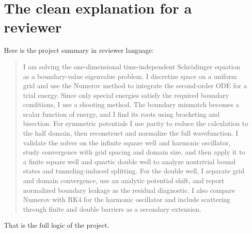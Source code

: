 \documentclass[11pt]{article}
\begin{document}
    \section{The clean explanation for a reviewer}

    Here is the project summary in reviewer language:

    \begin{quote}
    I am solving the one-dimensional time-independent Schr\"odinger equation as a boundary-value eigenvalue problem. I discretize space on a uniform grid and use the Numerov method to integrate the second-order ODE for a trial energy. Since only special energies satisfy the required boundary conditions, I use a shooting method. The boundary mismatch becomes a scalar function of energy, and I find its roots using bracketing and bisection. For symmetric potentials I use parity to reduce the calculation to the half domain, then reconstruct and normalize the full wavefunction. I validate the solver on the infinite square well and harmonic oscillator, study convergence with grid spacing and domain size, and then apply it to a finite square well and quartic double well to analyze nontrivial bound states and tunneling-induced splitting. For the double well, I separate grid and domain convergence, use an analytic potential shift, and report normalized boundary leakage as the residual diagnostic. I also compare Numerov with RK4 for the harmonic oscillator and include scattering through finite and double barriers as a secondary extension.
    \end{quote}

    That is the full logic of the project.
\end{document}
